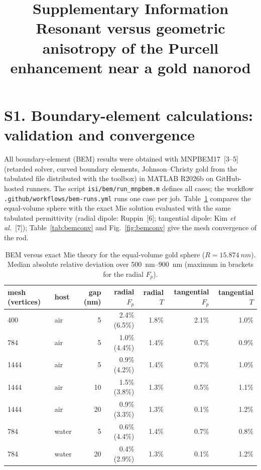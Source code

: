 \documentclass[11pt,a4paper]{article}
\title{Supplementary Information\\[4pt]\large Resonant versus geometric anisotropy of the Purcell enhancement near a gold nanorod}
\date{}
\newcommand{\Fp}{F_p}
\begin{document}
\maketitle

\section*{S1. Boundary-element calculations: validation and convergence}
All boundary-element (BEM) results were obtained with MNPBEM17~[3--5] (retarded solver, curved boundary elements,
Johnson--Christy gold from the tabulated file distributed with the toolbox) in MATLAB R2026b on GitHub-hosted
runners. The script \texttt{isi/bem/run\_mnpbem.m} defines all cases; the workflow
\texttt{.github/workflows/bem-runs.yml} runs one case per job. Table~\ref{tab:bemmie} compares the equal-volume sphere
with the exact Mie solution evaluated with the same tabulated permittivity (radial dipole: Ruppin~[6]; tangential
dipole: Kim \emph{et al.}~[7]); Table~\ref{tab:bemconv} and Fig.~\ref{fig:bemconv} give the mesh convergence of the rod.

\begin{table}[h]\centering
\caption{BEM versus exact Mie theory for the equal-volume gold sphere ($R=\SI{15.874}{nm}$). Median absolute
relative deviation over \SIrange{500}{900}{nm} (maximum in brackets for the radial $\Fp$).}\label{tab:bemmie}
\begin{tabular}{llrrrrr}\toprule
mesh (vertices) & host & gap (nm) & radial $\Fp$ & radial $T$ & tangential $\Fp$ & tangential $T$\\\midrule
400  & air & 5  & 2.4\% (6.5\%) & 1.8\% & 2.1\% & 1.0\%\\
784  & air & 5  & 1.0\% (4.4\%) & 1.4\% & 0.7\% & 0.9\%\\
1444 & air & 5  & 0.9\% (4.2\%) & 1.4\% & 0.7\% & 1.0\%\\
1444 & air & 10 & 1.5\% (3.8\%) & 1.3\% & 0.5\% & 1.1\%\\
1444 & air & 20 & 0.9\% (3.3\%) & 1.3\% & 0.1\% & 1.2\%\\
784  & water & 5  & 0.6\% (4.4\%) & 1.4\% & 0.7\% & 0.8\%\\
784  & water & 20 & 0.4\% (2.9\%) & 1.3\% & 0.1\% & 1.2\%\\\bottomrule
\end{tabular}\end{table}
\end{document}
